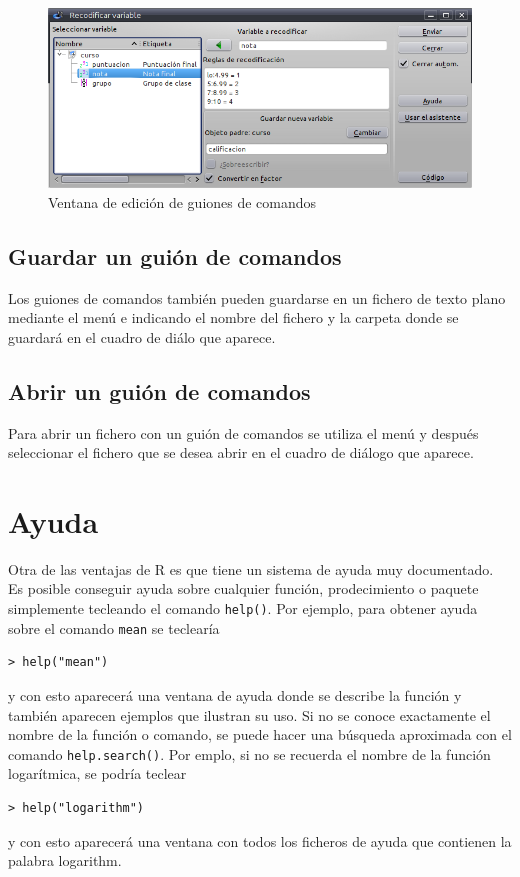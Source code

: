 \begin{figure}[htp]
\begin{center}
  \includegraphics[scale=0.6]{introduccion_r/img/recodificar}
  \caption{Ventana de edición de guiones de comandos}
  \label{g:guiones_comandos}
\end{center}
\end{figure}


\subsection{Guardar un guión de comandos}
Los guiones de comandos también pueden guardarse en un fichero de texto plano mediante el menú
 e indicando el nombre del fichero y la carpeta donde se guardará en el
cuadro de diálo que aparece.


\subsection{Abrir un guión de comandos}
Para abrir un fichero con un guión de comandos se utiliza el menú  y
después seleccionar el fichero que se desea abrir en el cuadro de diálogo que aparece. 


\section{Ayuda}
Otra de las ventajas de R es que tiene un sistema de ayuda muy documentado. Es posible conseguir ayuda sobre cualquier
función, prodecimiento o paquete simplemente tecleando el comando \lstinline{help()}. Por ejemplo, para obtener ayuda
sobre el comando \lstinline{mean} se teclearía
\begin{lstlisting}
> help("mean")
\end{lstlisting}
y con esto aparecerá una ventana de ayuda donde se describe la función y también aparecen ejemplos que ilustran su uso. 
Si no se conoce exactamente el nombre de la función o comando, se puede hacer una búsqueda aproximada con el comando
\lstinline{help.search()}. Por emplo, si no se recuerda el nombre de la función logarítmica, se podría
teclear
\begin{lstlisting}
> help("logarithm")
\end{lstlisting}
y con esto aparecerá una ventana con todos los ficheros de ayuda que contienen la palabra logarithm.

